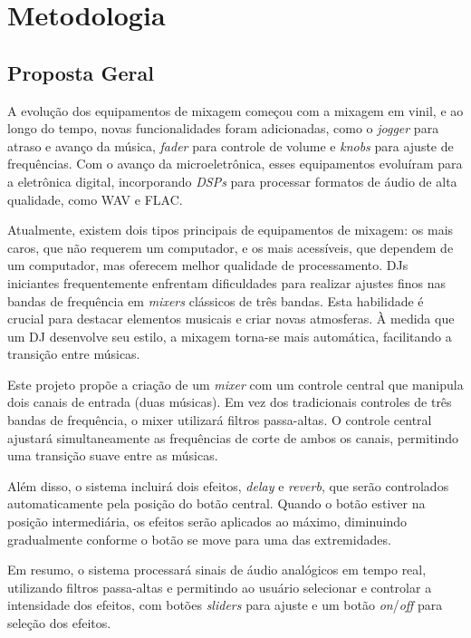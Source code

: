 \chapter[Metodologia]{Metodologia}
\section{Proposta Geral}

A evolução dos equipamentos de mixagem começou com a mixagem em vinil, e ao longo do tempo, novas funcionalidades foram adicionadas, como o \textit{jogger} para atraso e avanço da música, \textit{fader} para controle de volume e \textit{knobs} para ajuste de frequências. Com o avanço da microeletrônica, esses equipamentos evoluíram para a eletrônica digital, incorporando \textit{DSPs} para processar formatos de áudio de alta qualidade, como WAV e FLAC.

Atualmente, existem dois tipos principais de equipamentos de mixagem: os mais caros, que não requerem um computador, e os mais acessíveis, que dependem de um computador, mas oferecem melhor qualidade de processamento. DJs iniciantes frequentemente enfrentam dificuldades para realizar ajustes finos nas bandas de frequência em \textit{mixers} clássicos de três bandas. Esta habilidade é crucial para destacar elementos musicais e criar novas atmosferas. À medida que um DJ desenvolve seu estilo, a mixagem torna-se mais automática, facilitando a transição entre músicas.

Este projeto propõe a criação de um \textit{mixer} com um controle central que manipula dois canais de entrada (duas músicas). Em vez dos tradicionais controles de três bandas de frequência, o mixer utilizará filtros passa-altas. O controle central ajustará simultaneamente as frequências de corte de ambos os canais, permitindo uma transição suave entre as músicas.

Além disso, o sistema incluirá dois efeitos, \textit{delay} e \textit{reverb}, que serão controlados automaticamente pela posição do botão central. Quando o botão estiver na posição intermediária, os efeitos serão aplicados ao máximo, diminuindo gradualmente conforme o botão se move para uma das extremidades.

Em resumo, o sistema processará sinais de áudio analógicos em tempo real, utilizando filtros passa-altas e permitindo ao usuário selecionar e controlar a intensidade dos efeitos, com botões \textit{sliders} para ajuste e um botão \textit{on}/\textit{off} para seleção dos efeitos.

